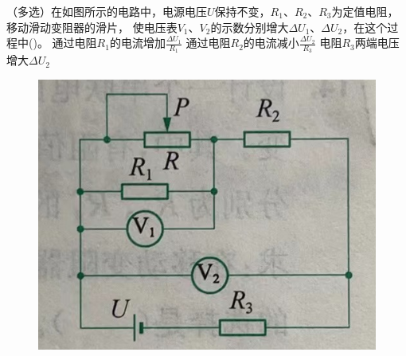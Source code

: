 \documentclass[a4paper,cs4size]{BHCexam}
\begin{document}
\begin{groups}
\begin{questions}[]
        \question[5] （多选）在如图所示的电路中，电源电压$U$保持不变，$R_1$、$R_2$、$R_3$为定值电阻，移动滑动变阻器的滑片，
        使电压表$V_1$、$V_2$的示数分别增大$\Delta U_1$、$\Delta U_2$，在这个过程中(\quad\quad\quad)。
        {通过电阻$R_1$的电流增加$\frac{\Delta U_1}{R_1}$}
        {通过电阻$R_2$的电流减小$\frac{\Delta U_2}{R_3}$}
        {电阻$R_3$两端电压增大$\Delta U_2$}
        \begin{figure}[htb]
            \flushright
            \includegraphics [scale=0.4,trim=0 0 0 0]{./image/physics_circuit3_7.png}
            \label{fig:fig_circuit3_7}
        \end{figure}
        \vspace{2.5cm}


\end{questions}
\end{groups}
\end{document}
